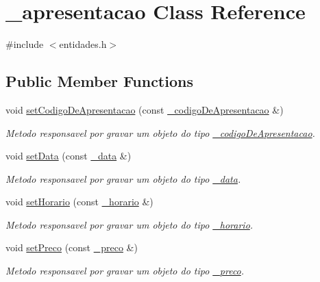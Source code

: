 \hypertarget{class__apresentacao}{}\section{\+\_\+apresentacao Class Reference}
\label{class__apresentacao}


{\ttfamily \#include $<$entidades.\+h$>$}

\subsection*{Public Member Functions}
\begin{DoxyCompactItemize}
\item 
void \mbox{\hyperlink{class__apresentacao_a599cb4f73b71a6da51413295aa7fa2ee}{set\+Codigo\+De\+Apresentacao}} (const \mbox{\hyperlink{class__codigo_de_apresentacao}{\+\_\+codigo\+De\+Apresentacao}} \&)
\begin{DoxyCompactList}\small\item\em Metodo responsavel por gravar um objeto do tipo \mbox{\hyperlink{class__codigo_de_apresentacao}{\+\_\+codigo\+De\+Apresentacao}}. \end{DoxyCompactList}\item 
void \mbox{\hyperlink{class__apresentacao_af74b2958dda02a2a76075057f66ddc7b}{set\+Data}} (const \mbox{\hyperlink{class__data}{\+\_\+data}} \&)
\begin{DoxyCompactList}\small\item\em Metodo responsavel por gravar um objeto do tipo \mbox{\hyperlink{class__data}{\+\_\+data}}. \end{DoxyCompactList}\item 
void \mbox{\hyperlink{class__apresentacao_a8d87172bb584afb7eba9143d6b7a1f35}{set\+Horario}} (const \mbox{\hyperlink{class__horario}{\+\_\+horario}} \&)
\begin{DoxyCompactList}\small\item\em Metodo responsavel por gravar um objeto do tipo \mbox{\hyperlink{class__horario}{\+\_\+horario}}. \end{DoxyCompactList}\item 
void \mbox{\hyperlink{class__apresentacao_a30284b1696d031a8546a5191d633dbef}{set\+Preco}} (const \mbox{\hyperlink{class__preco}{\+\_\+preco}} \&)
\begin{DoxyCompactList}\small\item\em Metodo responsavel por gravar um objeto do tipo \mbox{\hyperlink{class__preco}{\+\_\+preco}}. \end{DoxyCompactList}\item 

\end{DoxyCompactItemize}
